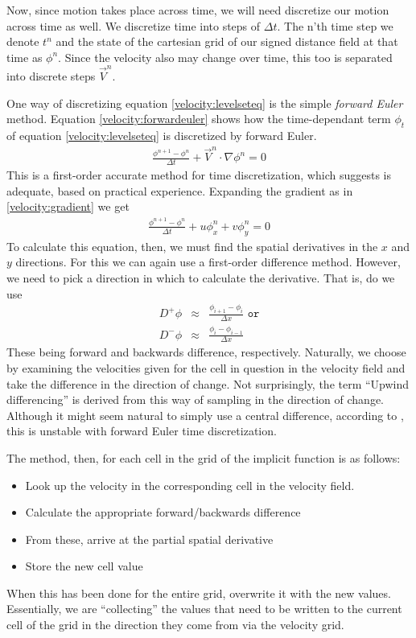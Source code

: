 Now, since motion takes place across time, we will need discretize our
motion across time as well. We discretize time into steps of $\Delta
t$. The n'th time step we denote $t^n$ and the state of the cartesian
grid of our signed distance field at that time as $\phi^n$. Since the
velocity also may change over time, this too is separated into
discrete steps $\vec{V}^n$.

One way of discretizing equation \ref{velocity:levelseteq} is the
simple \emph{forward Euler} method. Equation
\vref{velocity:forwardeuler} shows how the time-dependant term
$\phi_t$ of equation \ref{velocity:levelseteq} is discretized by
forward Euler.
\begin{eqnarray}
\label{velocity:forwardeuler}
\frac{\phi^{n+1}-\phi^n}{\Delta t}+\vec{V}^n\cdot\nabla\phi^n = 0
\end{eqnarray}
This is a first-order accurate method for time discretization, which
 suggests is adequate, based on practical
experience.  Expanding the gradient as in \vref{velocity:gradient} we
get
\begin{eqnarray}
\label{velocity:forwardeuler}
\frac{\phi^{n+1}-\phi^n}{\Delta t}+u\phi_{x}^n + v\phi_{y}^n = 0
\end{eqnarray}
To calculate this equation, then, we must find the spatial derivatives
in the $x$ and $y$ directions. For this we can again use a first-order
difference method. However, we need to pick a direction in which to
calculate the derivative. That is, do we use
\begin{eqnarray}
D^+\phi &\approx & \frac{\phi_{i+1} - \phi_i}{\Delta x} \texttt{ or}\\
D^-\phi &\approx & \frac{\phi_i - \phi_{i-1}}{\Delta x}
\end{eqnarray}
These being forward and backwards difference, respectively. Naturally,
we choose by examining the velocities given for the cell in question
in the velocity field and take the difference in the direction of
change. Not surprisingly, the term ``Upwind differencing'' is derived
from this way of sampling in the direction of change.  Although it
might seem natural to simply use a central difference, according to
, this is unstable with forward Euler time
discretization.

The method, then, for each cell in the grid of the implicit function
is as follows:
\begin{itemize}
\item Look up the velocity in the corresponding cell in the velocity
  field.
\item Calculate the appropriate forward/backwards difference
\item From these, arrive at the partial spatial derivative
\item Store the new cell value
\end{itemize}
When this has been done for the entire grid, overwrite it with the new
values.  Essentially, we are ``collecting'' the values that need to be
written to the current cell of the grid in the direction they come
from via the velocity grid.


